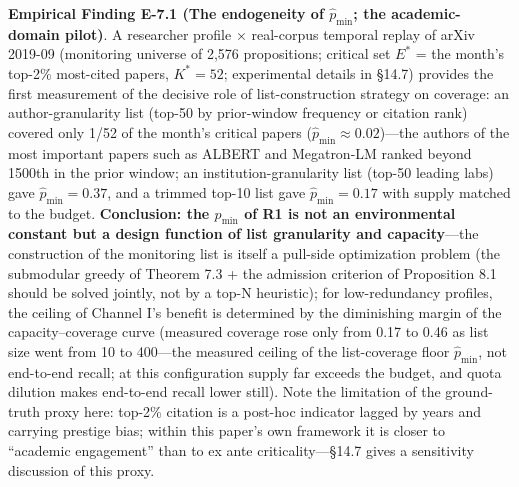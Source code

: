 \documentclass[
  11pt]{article}
\begin{document}
\textbf{Empirical Finding E-7.1 (The endogeneity of \(\hat p_{\min}\);
the academic-domain pilot)}. A researcher profile × real-corpus temporal
replay of arXiv 2019-09 (monitoring universe of 2,576 propositions;
critical set \(E^*\) = the month's top-2\% most-cited papers,
\(K^*=52\); experimental details in §14.7) provides the first
measurement of the decisive role of list-construction strategy on
coverage: an author-granularity list (top-50 by prior-window frequency
or citation rank) covered only 1/52 of the month's critical papers
(\(\hat p_{\min}\approx0.02\))---the authors of the most important
papers such as ALBERT and Megatron-LM ranked beyond 1500th in the prior
window; an institution-granularity list (top-50 leading labs) gave
\(\hat p_{\min}=0.37\), and a trimmed top-10 list gave
\(\hat p_{\min}=0.17\) with supply matched to the budget.
\textbf{Conclusion: the \(p_{\min}\) of R1 is not an environmental
constant but a design function of list granularity and capacity}---the
construction of the monitoring list is itself a pull-side optimization
problem (the submodular greedy of Theorem 7.3 + the admission criterion
of Proposition 8.1 should be solved jointly, not by a top-N heuristic);
for low-redundancy profiles, the ceiling of Channel I's benefit is
determined by the diminishing margin of the capacity--coverage curve
(measured coverage rose only from 0.17 to 0.46 as list size went from 10
to 400---the measured ceiling of the list-coverage floor
\(\hat p_{\min}\), not end-to-end recall; at this configuration supply
far exceeds the budget, and quota dilution makes end-to-end recall lower
still). Note the limitation of the ground-truth proxy here: top-2\%
citation is a post-hoc indicator lagged by years and carrying prestige
bias; within this paper's own framework it is closer to ``academic
engagement'' than to ex ante criticality---§14.7 gives a sensitivity
discussion of this proxy.
\end{document}
